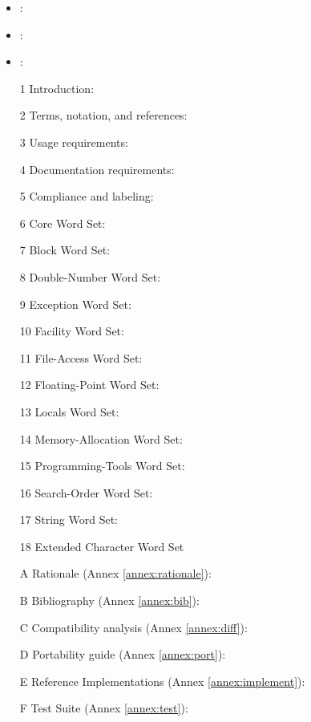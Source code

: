 	\begin{itemize}
	\item {}:						%
	\item {}:						%
	\item {}:					%
	\item[1] Introduction:						%
	\item[2] Terms, notation, and references:	%
	\item[3] Usage requirements:				%
	\item[4] Documentation requirements:	%
	\item[5] Compliance and labeling:		%
	\item[6] Core Word Set:					%
	\item[7] Block Word Set:					%
	\item[8] Double-Number Word Set:		%
	\item[9] Exception Word Set:				%
	\item[10] Facility Word Set:				%
	\item[11] File-Access Word Set:			%
	\item[12] Floating-Point Word Set:		%
	\item[13] Locals Word Set:				%
	\item[14] Memory-Allocation Word Set:	%
	\item[15] Programming-Tools Word Set:	%
	\item[16] Search-Order Word Set:		%
	\item[17] String Word Set:				%
	\item[18] Extended Character Word Set	%
	\item[A] Rationale (Annex \ref{annex:rationale}):	%
	\item[B] Bibliography (Annex \ref{annex:bib}):		%
	\item[C] Compatibility analysis (Annex \ref{annex:diff}):	%
	\item[D] Portability guide (Annex \ref{annex:port}):		%
	\item[E] Reference Implementations (Annex \ref{annex:implement}): %
	\item[F] Test Suite (Annex \ref{annex:test}):	%
	\end{itemize}

\endinput

\version{ToDo}{}{\empty}
	\begin{itemize}
	\item Develop new Globalisation word set
	\item Develop extended Memory Access word set
	\end{itemize}

